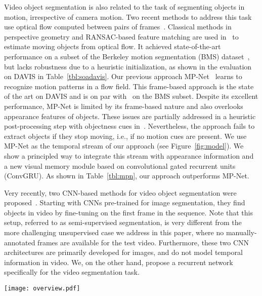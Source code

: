 \documentclass[10pt,twocolumn,letterpaper]{article}
\begin{document}
Video object segmentation is also related to the task of segmenting objects in
motion, irrespective of camera motion. Two recent methods to address this task
use optical flow computed between pairs of
frames~\cite{Bideau16,tokmakov2016learning}. Classical methods in perspective
geometry and RANSAC-based feature matching are used in~\cite{Bideau16} to
estimate moving objects from optical flow. It achieved state-of-the-art
performance on a subset of the Berkeley motion segmentation (BMS)
dataset~\cite{brox2010object}, but lacks robustness due to a heuristic
initialization, as shown in the evaluation on DAVIS in
Table~\ref{tbl:soadavis}. Our previous approach
MP-Net~\cite{tokmakov2016learning} learns to recognize motion patterns in a
flow field. This frame-based approach is the state of the art on DAVIS and is
on par with~\cite{Bideau16} on the BMS subset.  Despite its excellent
performance, MP-Net is limited by its frame-based nature and also overlooks
appearance features of objects. These issues are partially addressed in a
heuristic post-processing step with objectness cues
in~\cite{tokmakov2016learning}. Nevertheless, the approach fails to extract
objects if they stop moving, i.e., if no motion cues are present. We use MP-Net
as the temporal stream of our  approach (see Figure~\ref{fig:model}). We show a
principled way to integrate this stream with appearance information and a new
visual memory module based on convolutional gated recurrent units (ConvGRU). As
shown in Table~\ref{tbl:mpn}, our approach outperforms MP-Net. 

Very recently, two CNN-based methods for video object segmentation were
proposed~\cite{Khoreva16,Caelles17}. Starting with CNNs pre-trained for image
segmentation, they find objects in video by fine-tuning on the first frame in
the sequence. Note that this setup, referred to as semi-supervised
segmentation, is very different from the more challenging unsupervised case we
address in this paper, where no manually-annotated frames are available for the
test video. Furthermore, these two CNN architectures are primarily developed
for images, and do not model temporal information in video. We, on the other
hand, propose a recurrent network specifically for the video segmentation task.

\begin{figure*}[th]
\begin{center}
\texttt{[image: overview.pdf]}
\end{center}
\vspace{-0.3cm}
\caption{Overview of our segmentation approach. Each video frame is processed
by the appearance (green) and the motion (yellow) networks to produce an
intermediate two-stream representation. The ConvGRU module combines this with
the learned visual memory to compute the final segmentation result. The width
(w') and height (h') of the feature map and the output are  and
 respectively.}
\vspace{-0.3cm}
\label{fig:model}
\end{figure*}
\end{document}
